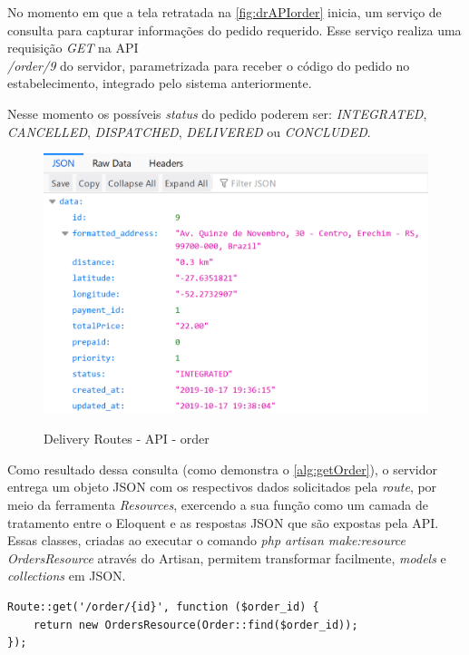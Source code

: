 No momento em que a tela retratada na \autoref{fig:drAPIorder} inicia, um serviço de consulta para capturar informações do pedido requerido. Esse serviço realiza uma requisição \textit{GET} na API 
\\ \textit{/order/9} do servidor, parametrizada para receber o código do pedido no estabelecimento, integrado pelo sistema anteriormente.

Nesse momento os possíveis \textit{status} do pedido poderem ser: \textit{INTEGRATED},
\\ \textit{CANCELLED}, \textit{DISPATCHED}, \textit{DELIVERED} ou \textit{CONCLUDED}.

\begin{figure}[H]
    \centering
    \caption{Delivery Routes - API - order}
    \includegraphics[width=1.0\textwidth]{./dados/figuras/fig22}
    \label{fig:drAPIorder}
\end{figure}

Como resultado dessa consulta (como demonstra o \autoref{alg:getOrder}), o servidor entrega um objeto JSON com os respectivos dados solicitados pela \textit{route}, por meio da ferramenta  \textit{Resources}, exercendo a sua função como um camada de tratamento entre o Eloquent e as respostas JSON que são expostas pela API. Essas classes, criadas ao executar o comando \textit{php artisan make:resource OrdersResource} através do Artisan, permitem transformar facilmente, \textit{models} e \textit{collections} em JSON.

\begin{lstlisting}[caption={Delivery Routes - Route order}, style=htmlcssjs, label=alg:getOrder]
Route::get('/order/{id}', function ($order_id) {
    return new OrdersResource(Order::find($order_id));
});
\end{lstlisting}